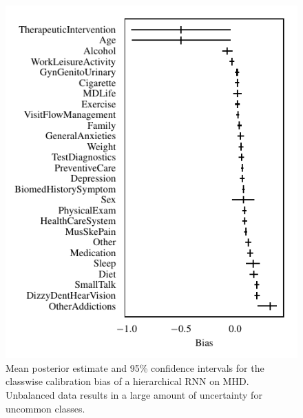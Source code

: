 \documentclass{article}
\begin{document}
\begin{figure}[t]
    \centering
    \includegraphics{figures/mhd_bias.pdf}  
    \caption{
        Mean posterior estimate and 95\% confidence intervals for the classwise calibration bias of a hierarchical RNN on MHD.
        Unbalanced data results in a large amount of uncertainty for uncommon classes. %
    }
    \label{fig:mhd_bias}
\end{figure}
\end{document}
